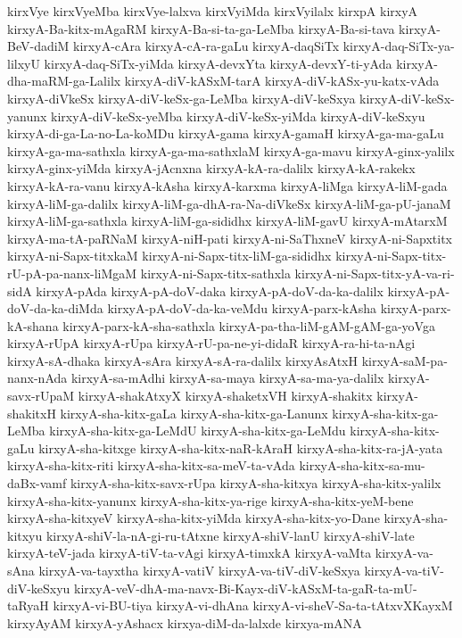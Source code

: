 {kirxVye
kirxVyeMba
kirxVye-lalxva
kirxVyiMda
kirxVyilalx
kirxpA
kirxyA
kirxyA-Ba-kitx-mAgaRM
kirxyA-Ba-si-ta-ga-LeMba
kirxyA-Ba-si-tava
kirxyA-BeV-dadiM
kirxyA-cAra
kirxyA-cA-ra-gaLu
kirxyA-daqSiTx
kirxyA-daq-SiTx-ya-lilxyU
kirxyA-daq-SiTx-yiMda
kirxyA-devxYta
kirxyA-devxY-ti-yAda
kirxyA-dha-maRM-ga-Lalilx
kirxyA-diV-kASxM-tarA
kirxyA-diV-kASx-yu-katx-vAda
kirxyA-diVkeSx
kirxyA-diV-keSx-ga-LeMba
kirxyA-diV-keSxya
kirxyA-diV-keSx-yanunx
kirxyA-diV-keSx-yeMba
kirxyA-diV-keSx-yiMda
kirxyA-diV-keSxyu
kirxyA-di-ga-La-no-La-koMDu
kirxyA-gama
kirxyA-gamaH
kirxyA-ga-ma-gaLu
kirxyA-ga-ma-sathxla
kirxyA-ga-ma-sathxlaM
kirxyA-ga-mavu
kirxyA-ginx-yalilx
kirxyA-ginx-yiMda
kirxyA-jAcnxna
kirxyA-kA-ra-dalilx
kirxyA-kA-rakekx
kirxyA-kA-ra-vanu
kirxyA-kAsha
kirxyA-karxma
kirxyA-liMga
kirxyA-liM-gada
kirxyA-liM-ga-dalilx
kirxyA-liM-ga-dhA-ra-Na-diVkeSx
kirxyA-liM-ga-pU-janaM
kirxyA-liM-ga-sathxla
kirxyA-liM-ga-sididhx
kirxyA-liM-gavU
kirxyA-mAtarxM
kirxyA-ma-tA-paRNaM
kirxyA-niH-pati
kirxyA-ni-SaThxneV
kirxyA-ni-Sapxtitx
kirxyA-ni-Sapx-titxkaM
kirxyA-ni-Sapx-titx-liM-ga-sididhx
kirxyA-ni-Sapx-titx-rU-pA-pa-nanx-liMgaM
kirxyA-ni-Sapx-titx-sathxla
kirxyA-ni-Sapx-titx-yA-va-ri-sidA
kirxyA-pAda
kirxyA-pA-doV-daka
kirxyA-pA-doV-da-ka-dalilx
kirxyA-pA-doV-da-ka-diMda
kirxyA-pA-doV-da-ka-veMdu
kirxyA-parx-kAsha
kirxyA-parx-kA-shana
kirxyA-parx-kA-sha-sathxla
kirxyA-pa-tha-liM-gAM-gAM-ga-yoVga
kirxyA-rUpA
kirxyA-rUpa
kirxyA-rU-pa-ne-yi-didaR
kirxyA-ra-hi-ta-nAgi
kirxyA-sA-dhaka
kirxyA-sAra
kirxyA-sA-ra-dalilx
kirxyAsAtxH
kirxyA-saM-pa-nanx-nAda
kirxyA-sa-mAdhi
kirxyA-sa-maya
kirxyA-sa-ma-ya-dalilx
kirxyA-savx-rUpaM
kirxyA-shakAtxyX
kirxyA-shaketxVH
kirxyA-shakitx
kirxyA-shakitxH
kirxyA-sha-kitx-gaLa
kirxyA-sha-kitx-ga-Lanunx
kirxyA-sha-kitx-ga-LeMba
kirxyA-sha-kitx-ga-LeMdU
kirxyA-sha-kitx-ga-LeMdu
kirxyA-sha-kitx-gaLu
kirxyA-sha-kitxge
kirxyA-sha-kitx-naR-kAraH
kirxyA-sha-kitx-ra-jA-yata
kirxyA-sha-kitx-riti
kirxyA-sha-kitx-sa-meV-ta-vAda
kirxyA-sha-kitx-sa-mu-daBx-vamf
kirxyA-sha-kitx-savx-rUpa
kirxyA-sha-kitxya
kirxyA-sha-kitx-yalilx
kirxyA-sha-kitx-yanunx
kirxyA-sha-kitx-ya-rige
kirxyA-sha-kitx-yeM-bene
kirxyA-sha-kitxyeV
kirxyA-sha-kitx-yiMda
kirxyA-sha-kitx-yo-Dane
kirxyA-sha-kitxyu
kirxyA-shiV-la-nA-gi-ru-tAtxne
kirxyA-shiV-lanU
kirxyA-shiV-late
kirxyA-teV-jada
kirxyA-tiV-ta-vAgi
kirxyA-timxkA
kirxyA-vaMta
kirxyA-va-sAna
kirxyA-va-tayxtha
kirxyA-vatiV
kirxyA-va-tiV-diV-keSxya
kirxyA-va-tiV-diV-keSxyu
kirxyA-veV-dhA-ma-navx-Bi-Kayx-diV-kASxM-ta-gaR-ta-mU-taRyaH
kirxyA-vi-BU-tiya
kirxyA-vi-dhAna
kirxyA-vi-sheV-Sa-ta-tAtxvXKayxM
kirxyAyAM
kirxyA-yAshacx
kirxya-diM-da-lalxde
kirxya-mANA
}
